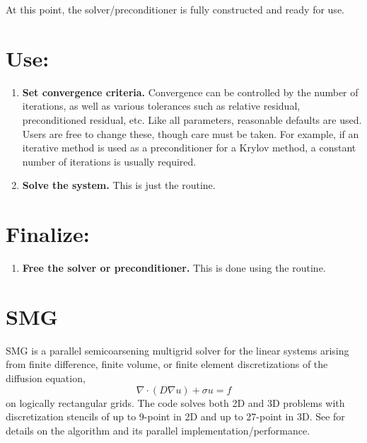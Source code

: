 At this point, the solver/preconditioner is fully constructed and
ready for use.


\section*{Use:}

\begin{enumerate}

\item
{\bf Set convergence criteria.}  Convergence can be controlled by the
number of iterations, as well as various tolerances such as relative
residual, preconditioned residual, etc.  Like all parameters,
reasonable defaults are used.  Users are free to change these, though
care must be taken.  For example, if an iterative method is used as a
preconditioner for a Krylov method, a constant number of iterations is
usually required.

\item
{\bf Solve the system.}  This is just the  routine.

\end{enumerate}


\section*{Finalize:}

\begin{enumerate}

\item
{\bf Free the solver or preconditioner.} This is done using the
 routine.

\end{enumerate}


\section{SMG}

SMG is a parallel semicoarsening multigrid solver for the linear
systems arising from finite difference, finite volume, or finite
element discretizations of the diffusion equation,
\begin{equation}
\nabla \cdot ( D \nabla u ) + \sigma u = f
\end{equation}
on logically rectangular grids.  The code solves both 2D and 3D
problems with discretization stencils of up to 9-point in 2D and up to
27-point in 3D.  See
\cite{SSchaffer_1998a,PNBrown_RDFalgout_JEJones_2000,RDFalgout_JEJones_2000}
for details on the algorithm and its parallel implementation/performance.

